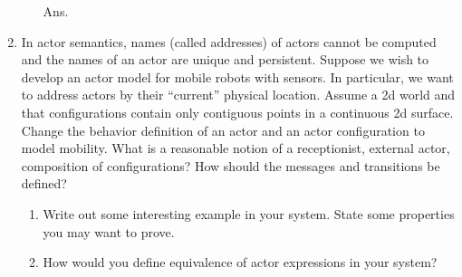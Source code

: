 \documentclass{article}
\begin{document}
\begin{enumerate}
\begin{enumerate}
Ans.


\end{enumerate}

\item In actor semantics, names (called addresses) of actors cannot be computed
and the names of an actor are unique and persistent. Suppose we wish to develop
an actor model for mobile robots with sensors. In particular, we want to address
actors by their ``current'' physical location. Assume a 2d world and that
configurations contain only contiguous points in a continuous 2d surface. Change
the behavior definition of an actor and an actor configuration to model
mobility. What is a reasonable notion of a receptionist, external actor,
composition of configurations? How should the messages and transitions be
defined?
\begin{enumerate}
\item Write out some interesting example in your system. State some properties
you may want to prove.

\item How would you define equivalence of actor expressions in your system?
\end{enumerate}

\end{enumerate}
\end{document}
